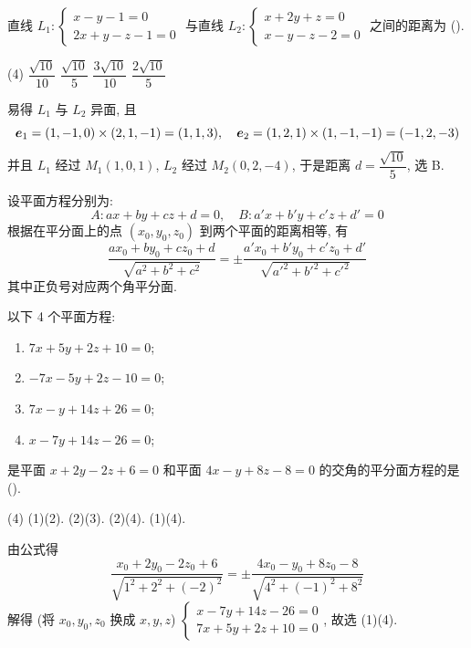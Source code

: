 \begin{example}
    直线 $L_1:\begin{cases}
            x-y-1=0 \\ 2x+y-z-1=0
        \end{cases}$ 与直线 $L_2:\begin{cases}
            x+2y+z=0 \\ x-y-z-2=0
        \end{cases}$ 之间的距离为 (\quad).
    \begin{tasks}(4)
        \task $\dfrac{\sqrt{10}}{10}$
        \task $\dfrac{\sqrt{10}}{5}$
        \task $\dfrac{3\sqrt{10}}{10}$
        \task $\dfrac{2\sqrt{10}}{5}$
    \end{tasks}
\end{example}
\begin{solution}
    易得 $L_1$ 与 $L_2$ 异面, 且 $$\vb*{e}_1=(1,-1,0)\times(2,1,-1)=(1,1,3), \quad \vb*{e}_2=(1,2,1)\times(1,-1,-1)=(-1,2,-3)$$
    并且 $L_1$ 经过 $M_1(1,0,1)$, $L_2$ 经过 $M_2(0,2,-4)$, 于是距离 $d=\dfrac{\sqrt{10}}{5}$, 选 B.
\end{solution}

\begin{theorem}[角平分面]
    设平面方程分别为:
    $$
    A:ax+by+cz+d=0,\quad B:a'x+b'y+c'z+d'=0
    $$
    根据在平分面上的点 $(x_0,y_0,z_0)$ 到两个平面的距离相等, 有 
    $$
    \dfrac{ax_0+by_0+cz_0+d}{\sqrt{a^2+b^2+c^2}}=\pm \dfrac{a'x_0+b'y_0+c'z_0+d'}{\sqrt{a'^2+b'^2+c'^2}}
    $$
    其中正负号对应两个角平分面.
\end{theorem}

\begin{example}
    以下 4 个平面方程:
    \begin{enumerate}[label=(\arabic{*})]
        \item $7x+5y+2z+10=0$;
        \item $-7x-5y+2z-10=0$;
        \item $7x-y+14z+26=0$;
        \item $x-7y+14z-26=0$;
    \end{enumerate}
    是平面 $x+2y-2z+6=0$ 和平面 $4x-y+8z-8=0$ 的交角的平分面方程的是 (\quad).
    \begin{tasks}(4)
        \task (1)(2).
        \task (2)(3).
        \task (2)(4).
        \task (1)(4).
    \end{tasks}
\end{example}
\begin{solution}
    由公式得 $$
    \dfrac{x_0+2y_0-2z_0+6}{\sqrt{1^2+2^2+(-2)^2}}=\pm \dfrac{4x_0-y_0+8z_0-8}{\sqrt{4^2+(-1)^2+8^2}}
    $$
    解得 (将 $x_0,y_0,z_0$ 换成 $x,y,z$) $\begin{cases}
        x-7y+14z-26=0\\ 7x+5y+2z+10=0
    \end{cases}$, 故选 (1)(4).
\end{solution}

